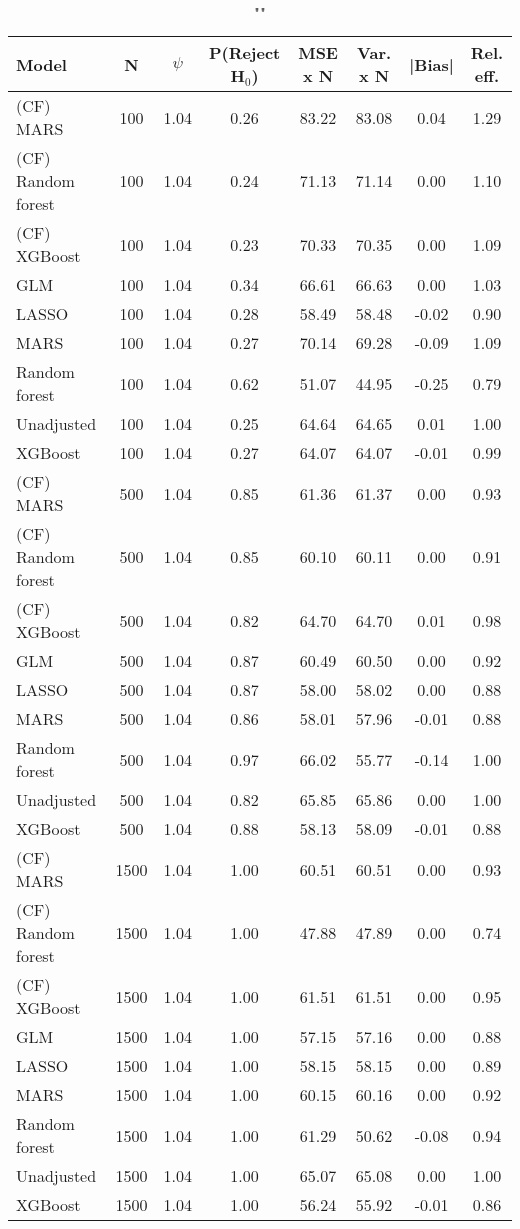 \begin{table}
\centering
\caption{""}
\begin{tabular}{lccccccc}
\toprule
Model & N & $\psi$ & P(Reject H$_0$) & MSE x N & Var. x N & |Bias| & Rel. eff.\\ \midrule
(CF) MARS & 100 & 1.04 & 0.26 & 83.22 & 83.08 &  0.04 & 1.29 \\ 
(CF) Random forest & 100 & 1.04 & 0.24 & 71.13 & 71.14 &  0.00 & 1.10 \\ 
(CF) XGBoost & 100 & 1.04 & 0.23 & 70.33 & 70.35 &  0.00 & 1.09 \\ 
GLM & 100 & 1.04 & 0.34 & 66.61 & 66.63 &  0.00 & 1.03 \\ 
LASSO & 100 & 1.04 & 0.28 & 58.49 & 58.48 & -0.02 & 0.90 \\ 
MARS & 100 & 1.04 & 0.27 & 70.14 & 69.28 & -0.09 & 1.09 \\ 
Random forest & 100 & 1.04 & 0.62 & 51.07 & 44.95 & -0.25 & 0.79 \\ 
Unadjusted & 100 & 1.04 & 0.25 & 64.64 & 64.65 &  0.01 & 1.00 \\ 
XGBoost & 100 & 1.04 & 0.27 & 64.07 & 64.07 & -0.01 & 0.99 \\ \addlinespace 
(CF) MARS & 500 & 1.04 & 0.85 & 61.36 & 61.37 &  0.00 & 0.93 \\ 
(CF) Random forest & 500 & 1.04 & 0.85 & 60.10 & 60.11 &  0.00 & 0.91 \\ 
(CF) XGBoost & 500 & 1.04 & 0.82 & 64.70 & 64.70 &  0.01 & 0.98 \\ 
GLM & 500 & 1.04 & 0.87 & 60.49 & 60.50 &  0.00 & 0.92 \\ 
LASSO & 500 & 1.04 & 0.87 & 58.00 & 58.02 &  0.00 & 0.88 \\ 
MARS & 500 & 1.04 & 0.86 & 58.01 & 57.96 & -0.01 & 0.88 \\ 
Random forest & 500 & 1.04 & 0.97 & 66.02 & 55.77 & -0.14 & 1.00 \\ 
Unadjusted & 500 & 1.04 & 0.82 & 65.85 & 65.86 &  0.00 & 1.00 \\ 
XGBoost & 500 & 1.04 & 0.88 & 58.13 & 58.09 & -0.01 & 0.88 \\ \addlinespace 
(CF) MARS & 1500 & 1.04 & 1.00 & 60.51 & 60.51 &  0.00 & 0.93 \\ 
(CF) Random forest & 1500 & 1.04 & 1.00 & 47.88 & 47.89 &  0.00 & 0.74 \\ 
(CF) XGBoost & 1500 & 1.04 & 1.00 & 61.51 & 61.51 &  0.00 & 0.95 \\ 
GLM & 1500 & 1.04 & 1.00 & 57.15 & 57.16 &  0.00 & 0.88 \\ 
LASSO & 1500 & 1.04 & 1.00 & 58.15 & 58.15 &  0.00 & 0.89 \\ 
MARS & 1500 & 1.04 & 1.00 & 60.15 & 60.16 &  0.00 & 0.92 \\ 
Random forest & 1500 & 1.04 & 1.00 & 61.29 & 50.62 & -0.08 & 0.94 \\ 
Unadjusted & 1500 & 1.04 & 1.00 & 65.07 & 65.08 &  0.00 & 1.00 \\ 
XGBoost & 1500 & 1.04 & 1.00 & 56.24 & 55.92 & -0.01 & 0.86 \\
\bottomrule
\end{tabular}
\end{table}

